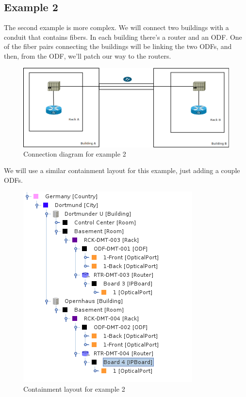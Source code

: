 \documentclass[a4paper]{article}
\begin{document}
		\subsection{Example 2}	
			The second example is more complex. We will connect two buildings with a conduit that contains fibers. In each building there's a router and an ODF. One of the fiber pairs connecting the buildings will be linking the two ODFs, and then, from the ODF, we'll patch our way to the routers.
			\begin{figure}[h!]
				\centering
				\includegraphics[width=0.8\linewidth]{img/l1_example_2.png}
				\caption{Connection diagram for example 2}
				\label{fig:l1_example_2}
			\end{figure}
			\newpage
			We will use a similar containment layout for this example, just adding a couple ODFs.
			\begin{figure}[h!]
				\centering
				\includegraphics[width=0.4\linewidth]{img/l1_example_2_layout.png}
				\caption{Containment layout for example 2}
				\label{fig:l1_example_2_layout}
			\end{figure}
			
\end{document}
